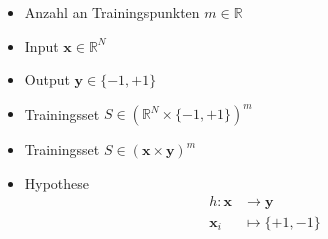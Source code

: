 \begin{frame}
    \begin{itemize}
        \item Anzahl an Trainingspunkten $ m \in \mathbb{R} $
        \item Input $ \boldsymbol{x} \in \mathbb{R}^N $
        \item Output $ \boldsymbol{y} \in \{ -1, +1 \} $
        \item Trainingsset $S \in (\mathbb{R}^N \times \{ -1, +1 \})^m $
        \item Trainingsset $S \in (\boldsymbol{x} \times \boldsymbol{y})^m $
    \end{itemize}

    \vspace{2mm}

    \begin{itemize}
        \item Hypothese
            \begin{align*}
                h: \boldsymbol{x} &\to \boldsymbol{y} \\
                \boldsymbol{x}_i &\mapsto \{ +1, -1 \} \\
            \end{align*}
    \end{itemize}
\end{frame}

